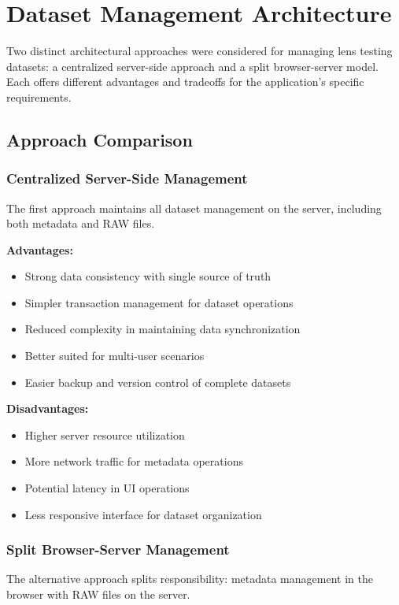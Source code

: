 \section{Dataset Management Architecture}

Two distinct architectural approaches were considered for managing lens testing datasets: a centralized server-side approach and a split browser-server model. Each offers different advantages and tradeoffs for the application's specific requirements.

\subsection{Approach Comparison}

\subsubsection{Centralized Server-Side Management}
The first approach maintains all dataset management on the server, including both metadata and RAW files.

\textbf{Advantages:}
\begin{itemize}
    \item Strong data consistency with single source of truth
    \item Simpler transaction management for dataset operations
    \item Reduced complexity in maintaining data synchronization
    \item Better suited for multi-user scenarios
    \item Easier backup and version control of complete datasets
\end{itemize}

\textbf{Disadvantages:}
\begin{itemize}
    \item Higher server resource utilization
    \item More network traffic for metadata operations
    \item Potential latency in UI operations
    \item Less responsive interface for dataset organization
\end{itemize}

\subsubsection{Split Browser-Server Management}
The alternative approach splits responsibility: metadata management in the browser with RAW files on the server.

